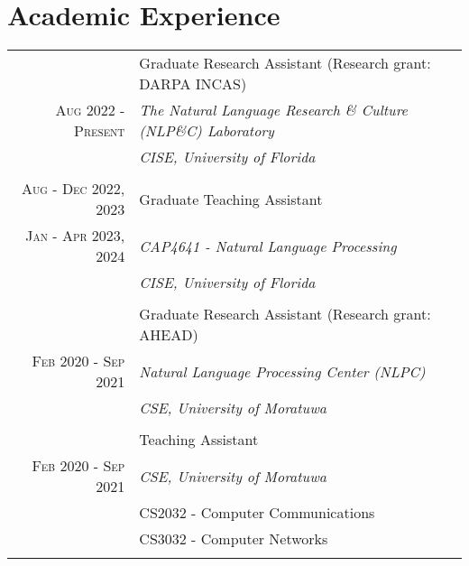 \documentclass[a4paper,11pt]{article}
\begin{document}
\section{Academic Experience}
\begin{tabular}{r|p{15cm}}
 \emph{} & Graduate Research Assistant (Research grant: DARPA INCAS) \textsc{}  \\\textsc{Aug 2022 - Present}&\emph{The Natural Language Research \& Culture (NLP\&C) Laboratory} \\ &\emph{CISE, University of Florida} \\\multicolumn{2}{c}{} \\
 



\emph{} \textsc{ Aug - Dec 2022, 2023}& Graduate Teaching Assistant \textsc{}  \\\textsc{Jan - Apr 2023, 2024}&\emph{CAP4641 - Natural Language Processing} \textsc{} \\\textsc{}&\emph{CISE, University of Florida} \\\multicolumn{2}{c}{} \\

 \emph{} & Graduate Research Assistant (Research grant: AHEAD) \textsc{}  \\\textsc{Feb 2020 - Sep 2021}&\emph{Natural Language Processing Center (NLPC)} \\ &\emph{CSE, University of Moratuwa}\\\multicolumn{2}{c}{} \\
 
 \emph{} & Teaching Assistant\\\textsc{Feb 2020 - Sep 2021}  &\emph{CSE, University of Moratuwa}\\ &\footnotesize{CS2032 - Computer Communications}\\ &\footnotesize{CS3032 - Computer Networks}\\\multicolumn{2}{c}{} \\
 
  
\end{tabular}
\end{document}
